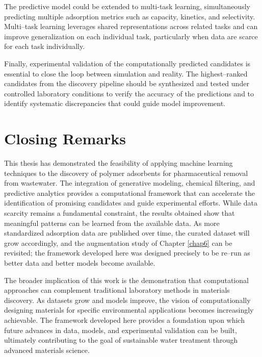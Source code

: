 The predictive model could be extended to multi-task learning, simultaneously predicting multiple adsorption metrics such as capacity, kinetics, and selectivity. Multi--task learning leverages shared representations across related tasks and can improve generalization on each individual task, particularly when data are scarce for each task individually.

Finally, experimental validation of the computationally predicted candidates is essential to close the loop between simulation and reality. The highest--ranked candidates from the discovery pipeline should be synthesized and tested under controlled laboratory conditions to verify the accuracy of the predictions and to identify systematic discrepancies that could guide model improvement.

\section{Closing Remarks}
\label{sec:closing}

This thesis has demonstrated the feasibility of applying machine learning techniques to the discovery of polymer adsorbents for pharmaceutical removal from wastewater. The integration of generative modeling, chemical filtering, and predictive analytics provides a computational framework that can accelerate the identification of promising candidates and guide experimental efforts. While data scarcity remains a fundamental constraint, the results obtained show that meaningful patterns can be learned from the available data. As more standardized adsorption data are published over time, the curated dataset will grow accordingly, and the augmentation study of Chapter \ref{chap6} can be revisited; the framework developed here was designed precisely to be re--run as better data and better models become available.

The broader implication of this work is the demonstration that computational approaches can complement traditional laboratory methods in materials discovery. As datasets grow and models improve, the vision of computationally designing materials for specific environmental applications becomes increasingly achievable. The framework developed here provides a foundation upon which future advances in data, models, and experimental validation can be built, ultimately contributing to the goal of sustainable water treatment through advanced materials science.

